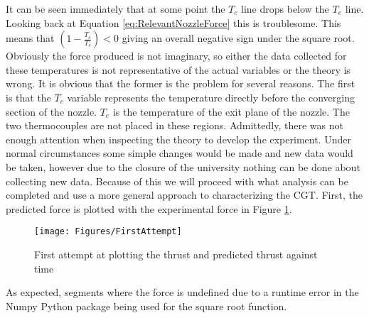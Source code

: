 It can be seen immediately that at some point the $T_c$ line drops below the $T_e$ line. Looking back at Equation \ref{eq:RelevantNozzleForce} this is troublesome. This means that $\left(1-\frac{T_e}{T_c}\right)<0$ giving an overall negative sign under the square root. Obviously the force produced is not imaginary, so either the data collected for these temperatures is not representative of the actual variables or the theory is wrong. It is obvious that the former is the problem for several reasons. The first is that the $T_c$ variable represents the temperature directly before the converging section of the nozzle. $T_e$ is the temperature of the exit plane of the nozzle. The two thermocouples are not placed in these regions. Admittedly, there was not enough attention when inspecting the theory to develop the experiment. Under normal circumstances some simple changes would be made and new data would be taken, however due to the closure of the university nothing can be done about collecting new data. Because of this we will proceed with what analysis can be completed and use a more general approach to characterizing the CGT. First, the predicted force is plotted with the experimental force in Figure \ref{fig:FirstThrust}. 
\begin{figure}[h!]
\centering
\texttt{[image: Figures/FirstAttempt]}
\caption{First attempt at plotting the thrust and predicted thrust against time}
\label{fig:FirstThrust}
\end{figure}
As expected, segments where the force is undefined due to a runtime error in the Numpy Python package being used for the square root function.
